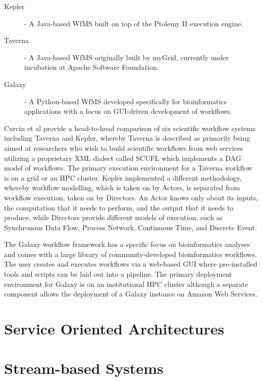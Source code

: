 \begin{description}
\item[Kepler\autocite{ludascher2006scientific}] - A Java-based WfMS built on top of the Ptolemy II\autocite{davis1999overview} execution engine.
\item[Taverna\autocite{oinn2004taverna}] - A Java-based WfMS originally built by myGrid, currently under incubation at Apache Software Foundation. 
\item[Galaxy\autocite{goecks2010galaxy}] - A Python-based WfMS developed specifically for bioinformatics applications with a focus on GUI-driven development of workflows.
\end{description}

Curcin et al\autocite{curcin2008scientific} provide a head-to-head comparison of six scientific workflow systems including Taverna and Kepler, whereby Taverna is described as primarily being aimed at researchers who wish to build scientific workflows from web services utilizing a proprietary XML dialect called SCUFL which implements a DAG model of workflows. The primary execution environment for a Taverna workflow is on a grid or an HPC cluster. Kepler implemented a different methodology, whereby workflow modelling, which is taken on by Actors, is separated from workflow execution, taken on by Directors. An Actor knows only about its inputs, the computation that it needs to perform, and the output that it needs to produce, while Directors provide different models of execution, such as Synchronous Data Flow, Process Network, Continuous Time, and Discrete Event.

The Galaxy workflow framework has a specific focus on bioinformatics analyses and comes with a large library of community-developed bioinformatics workflows. The user creates and executes workflows via a web-based GUI where pre-installed tools and scripts can be laid out into a pipeline. The primary deployment environment for Galaxy is on an institutional HPC cluster although a separate component allows the deployment of a Galaxy instance on Amazon Web Services\autocite{afgan2010galaxy}.

\section{Service Oriented Architectures}

\section{Stream-based Systems}

